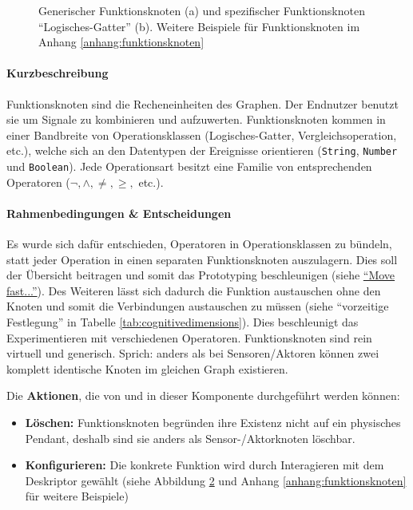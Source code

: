 \begin{figure}[h]
\begin{subfigure}{.5\textwidth}
  \caption{}
  \label{fig:functionnodesgate}
\end{subfigure}
    \caption{Generischer Funktionsknoten (a) und spezifischer Funktionsknoten "`Logisches-Gatter"' (b). Weitere Beispiele für Funktionsknoten im Anhang \ref{anhang:funktionsknoten}}
    \label{fig:functionnodes}
\end{figure}

\paragraph{Kurzbeschreibung} Funktionsknoten sind die Recheneinheiten des Graphen. Der Endnutzer benutzt sie um Signale zu kombinieren und aufzuwerten. Funktionsknoten kommen in einer Bandbreite von Operationsklassen (Logisches-Gatter, Vergleichsoperation, etc.), welche sich an den Datentypen der Ereignisse orientieren (\texttt{String}, \texttt{Number} und \texttt{Boolean}). Jede Operationsart besitzt eine Familie von entsprechenden Operatoren ($\neg, \land,\neq,\geq,$ etc.).

\paragraph{Rahmenbedingungen \& Entscheidungen} Es wurde sich dafür entschieden, Operatoren in Operationsklassen zu bündeln, statt jeder Operation in einen separaten Funktionsknoten auszulagern. Dies soll der Übersicht beitragen und somit das Prototyping beschleunigen (siehe \hyperref[par:movefast]{"`Move fast..."'}). Des Weiteren lässt sich dadurch die Funktion austauschen ohne den Knoten und somit die Verbindungen austauschen zu müssen (siehe "`vorzeitige Festlegung"' in Tabelle \ref{tab:cognitivedimensions}). Dies beschleunigt das Experimentieren mit verschiedenen Operatoren. Funktionsknoten sind rein virtuell und generisch. Sprich: anders als bei Sensoren/Aktoren können zwei komplett identische Knoten im gleichen Graph existieren.

Die \textbf{Aktionen}, die von und in dieser Komponente durchgeführt werden können: 
\begin{itemize}
    \item \textbf{Löschen:} Funktionsknoten begründen ihre Existenz nicht auf ein physisches Pendant, deshalb sind sie anders als Sensor-/Aktorknoten löschbar.
    \item \textbf{Konfigurieren:} Die konkrete Funktion wird durch Interagieren mit dem Deskriptor gewählt (siehe Abbildung \ref{fig:functionnodes} und Anhang \ref{anhang:funktionsknoten} für weitere Beispiele)
\end{itemize}

